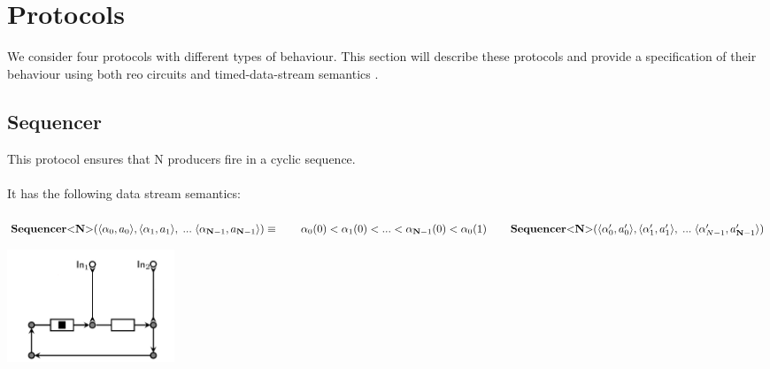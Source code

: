 \section{Protocols} \label{sec:protocols}
We consider four protocols with different types of behaviour. This section will describe these protocols and provide a specification of their behaviour using both reo circuits \cite{puff} and timed-data-stream semantics \cite{datastream}.

\subsection{Sequencer}%
\begin{minipage}{.65\textwidth}
  This protocol ensures that N producers fire in a cyclic sequence.\\\\
  It has the following data stream semantics:\\\\
  $
  \vspace{0.2cm}\sequencer (\langle \alpha_0, a_0 \rangle, \langle \alpha_1, a_1 \rangle,\;...\; \langle \alpha_{\textbf{N}-1}, a_{\textbf{N}-1} \rangle) \equiv \\
  \vspace{0.2cm}\hphantom \qquad  \alpha_0(0) < \alpha_1(0) < ... < \alpha_{\textbf{N}-1}(0) < \alpha_0(1) \\
  \hphantom \qquad \sequencer(\langle \alpha_0', a_0' \rangle, \langle \alpha_1', a_1' \rangle,\;...\; \langle \alpha_{N-1}', a_{\textbf{N}-1}' \rangle)
  $
\end{minipage}\hfill
\begin{minipage}{.25\textwidth}
  \includegraphics[width=5cm]{img/seq.png}
\end{minipage}

